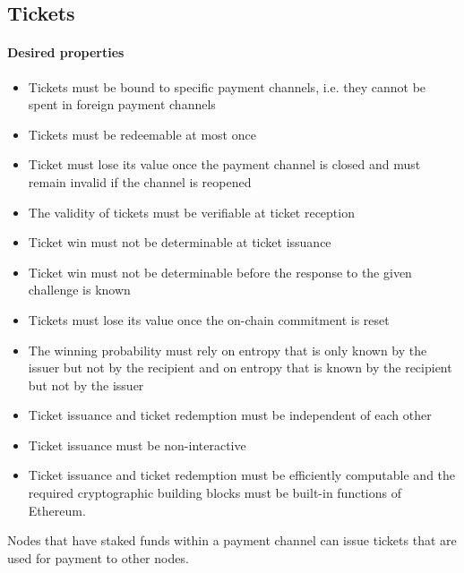 \subsection{Tickets}
\paragraph{Desired properties}
\begin{itemize}
    \item Tickets must be bound to specific payment channels, i.e. they cannot be spent in foreign payment channels
    \item Tickets must be redeemable at most once
    \item Ticket must lose its value once the payment channel is closed and must remain invalid if the channel is reopened
    \item The validity of tickets must be verifiable at ticket reception
    \item Ticket win must not be determinable at ticket issuance
    \item Ticket win must not be determinable before the response to the given challenge is known
    \item Tickets must lose its value once the on-chain commitment is reset
    \item The winning probability must rely on entropy that is only known by the issuer but not by the recipient and on entropy that is known by the recipient but not by the issuer
    \item Ticket issuance and ticket redemption must be independent of each other
    \item Ticket issuance must be non-interactive
    \item Ticket issuance and ticket redemption must be efficiently computable and the required cryptographic building blocks must be built-in functions of Ethereum.

\end{itemize}
Nodes that have staked funds within a payment channel can issue tickets that are used for payment to other nodes.
